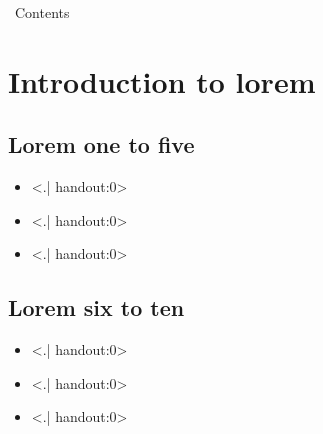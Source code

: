 


  \begin{frame}[plain]
    \titlepage
  \end{frame}

  \begin{frame}{~}{Contents}
    \tableofcontents[pausesections]
  \end{frame}

  \section{Introduction to lorem}

  \subsection{Lorem one to five}

  \begin{frame}{\framesectiontitle}{\framesectionsubtitle}
    \begin{itemize}[<+->] \footnotesize
      \item \alert<.| handout:0>{\lipsumgetsentence[3]}
      \item \alert<.| handout:0>{\lipsumgetsentence[4]}
      \item \alert<.| handout:0>{\lipsumgetsentence[5]}
    \end{itemize}
  \end{frame}

  \subsection{Lorem six to ten}

  \begin{frame}{\framesectiontitle}{\framesectionsubtitle}
    \begin{itemize}[<+->] \footnotesize
      \item \alert<.| handout:0>{\lipsumgetsentence[7]}
      \item \alert<.| handout:0>{\lipsumgetsentence[8]}
      \item \alert<.| handout:0>{\lipsumgetsentence[9]}
    \end{itemize}
  \end{frame}

